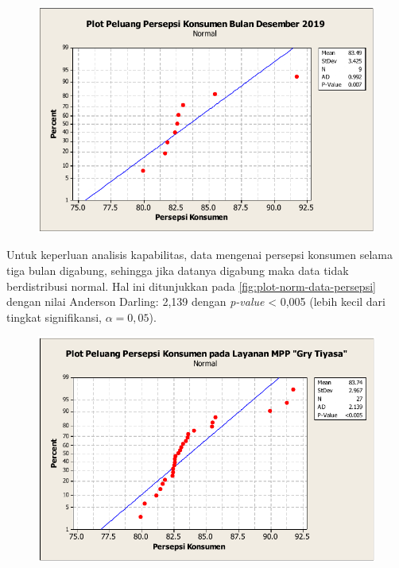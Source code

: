 \begin{figure}[H]
    \centering
    \includegraphics[width=.7\linewidth]{pdf/Plot-peluang-normal-pada-persepsi-konsumen-terhadap-layanan-di-MMP-Grha-Tiyasa-pada-bulan-Desember-2019.pdf}
    \label{fig:plot-norm-layanan-desember}
\end{figure}

Untuk keperluan analisis kapabilitas, data mengenai persepsi konsumen selama tiga bulan digabung, sehingga jika datanya digabung maka data tidak berdistribusi normal. Hal ini ditunjukkan pada \autoref{fig:plot-norm-data-persepsi} dengan nilai Anderson Darling: 2,139 dengan \textit{p-value} < 0,005 (lebih kecil dari tingkat signifikansi, $\alpha = 0,05$).

\begin{figure}[H]
    \centering
    \includegraphics[width=.7\linewidth]{pdf/Plot-peluang-normal-pada-data-persepsi-konsumen-selama-3-bulan.pdf}
    \label{fig:plot-norm-data-persepsi}
\end{figure}

